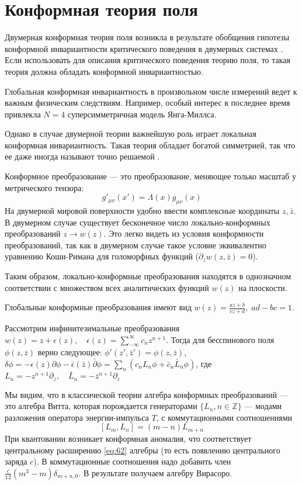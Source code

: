 

\chapter{Конформная теория поля}
\label{cha:CFT}

Двумерная конформная теория поля возникла в результате обобщения гипотезы конформной инвариантности критического поведения в двумерных системах \cite{Polyakov:1970xd}. Если использовать для описания критического поведения теорию поля, то такая теория должна обладать конформной инвариантностью.

Глобальная конформная инвариантность в произвольном числе измерений ведет к важным физическим следствиям. Например, особый интерес в последнее время привлекла $N=4$ суперсимметричная модель Янга-Миллса.

 Однако в случае двумерной теории важнейшую роль играет локальная конформная инвариантность.  Такая теория обладает богатой симметрией, так что ее даже иногда называют точно решаемой \cite{belavin1984ics}.

Конформное преобразование --- это преобразование, меняющее только масштаб у метрического тензора:
\begin{equation}
  \label{eq:10}
  g'_{\mu\nu}(x')=\Lambda(x)g_{\mu\nu}(x)
\end{equation}
На двумерной мировой поверхности удобно ввести комплексные координаты $z,\bar{z}$. 
В двумерном случае существует бесконечное число локально-конформных преобразований $z\to w(z)$.
Это легко видеть из условия конформности преобразований, так как в двумерном случае такое
условие эквивалентно уравнению Коши-Римана для голоморфных функций ($\partial_{\bar z}w(z,\bar
z)=0$).

Таким образом, локально-конформные преобразования находятся в однозначном соответствии с множеством
всех аналитических функций $w(z)$ на плоскости.  

Глобальные конформные преобразования имеют вид $w(z)=\frac{az+b}{cz+d},\; ad-bc=1$. 

Рассмотрим инфинитезимальные преобразования $w(z)=z+\epsilon(z),\quad \epsilon(z)=\sum_{-\infty}^{\infty}c_nz^{n+1}$. 
Тогда для бесспинового поля $\phi(z,\bar z)$ верно следующее: $\phi'(z',\bar z')=\phi(z,\bar z)$,
$\delta\phi=-\epsilon(z)\partial\phi-\bar \epsilon(\bar z)\bar \partial \phi=\sum_n(c_n L_n\phi+\bar
c_n\bar L_n\phi)$, где $L_n=-z^{n+1}\partial_z,\quad \bar L_n=-\bar z^{n+1}\partial_{\bar z}$

Мы видим, что в классической теории алгебра конформных преобразований --- это алгебра Витта, которая
порождается генераторами $\{L_n, n\in \mathbb{Z}\}$ --- модами разложения оператора энергии-импульса $T$, с
коммутационными соотношениями
\begin{equation}
  \label{eq:2}
  [L_m,L_n]=(m-n)L_{m+n}
\end{equation}
При квантовании возникает конформная аномалия, что соответствует центральному расширению \eqref{eq:62} алгебры  (то
есть появлению центрального заряда $c$). В коммутационные соотношения надо добавить член
$\frac{c}{12}(m^3-m)\delta_{m+n,0}$. В результате получаем алгебру Вирасоро.

